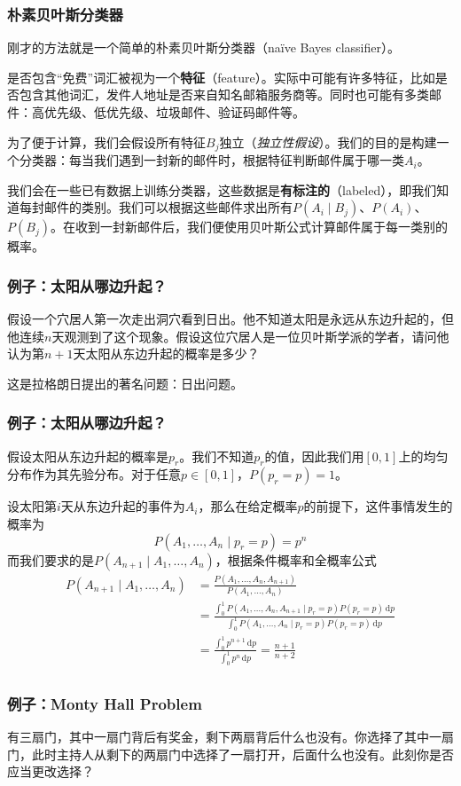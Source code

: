 \documentclass[9pt,dvipsnames]{beamer}
\renewcommand{\d}{\,\mathrm{d}}
\begin{document}
\begin{frame}
	\frametitle{朴素贝叶斯分类器}
	刚才的方法就是一个简单的朴素贝叶斯分类器（na\"ive Bayes classifier）。

	是否包含``免费''词汇被视为一个\textbf{特征}（feature）。实际中可能有许多特征，比如是否包含其他词汇，发件人地址是否来自知名邮箱服务商等。同时也可能有多类邮件：高优先级、低优先级、垃圾邮件、验证码邮件等。

	为了便于计算，我们会假设所有特征$B_j$独立（\textit{独立性假设}）。我们的目的是构建一个分类器：每当我们遇到一封新的邮件时，根据特征判断邮件属于哪一类$A_i$。

	我们会在一些已有数据上训练分类器，这些数据是\textbf{有标注的}（labeled），即我们知道每封邮件的类别。我们可以根据这些邮件求出所有$P(A_i\mid B_j)$、$P(A_i)$、$P(B_j)$。在收到一封新邮件后，我们便使用贝叶斯公式计算邮件属于每一类别的概率。
\end{frame}
\begin{frame}
	\frametitle{例子：太阳从哪边升起？}
	假设一个穴居人第一次走出洞穴看到日出。他不知道太阳是永远从东边升起的，但他连续$n$天观测到了这个现象。假设这位穴居人是一位贝叶斯学派的学者，请问他认为第$n+1$天太阳从东边升起的概率是多少？
	\vspace{1em}

	这是拉格朗日提出的著名问题：日出问题。
\end{frame}
\begin{frame}
	\frametitle{例子：太阳从哪边升起？}
	假设太阳从东边升起的概率是$p_r$。我们不知道$p_r$的值，因此我们用$[0,1]$上的均匀分布作为其先验分布。对于任意$p\in [0, 1]$，$P(p_r=p)=1$。\pause

	设太阳第$i$天从东边升起的事件为$A_i$，那么在给定概率$p$的前提下，这件事情发生的概率为
	\[ P(A_1,\ldots,A_n\mid p_r=p) = p^n \]
	而我们要求的是$P(A_{n+1}\mid A_1,\ldots,A_n)$，根据条件概率和全概率公式
	\begin{align*}
		P(A_{n+1}\mid A_1,\ldots,A_n) & = \frac{P(A_1,\ldots,A_n,A_{n+1})}{P(A_1,\ldots,A_n)} \\
		 & = \frac{\int_0^1 P(A_1,\ldots,A_n,A_{n+1}\mid p_r=p)P(p_r=p) \d p}{\int_0^1 P(A_1,\ldots,A_n\mid p_r=p)P(p_r=p) \d p} \\
		 & = \frac{\int_0^1 p^{n+1}\d p}{\int_0^1 p^n\d p} = \frac{n+1}{n+2} \\
	\end{align*}
\end{frame}
\begin{frame}
	\frametitle{例子：Monty Hall Problem}
	有三扇门，其中一扇门背后有奖金，剩下两扇背后什么也没有。你选择了其中一扇门，此时主持人从剩下的两扇门中选择了一扇打开，后面什么也没有。此刻你是否应当更改选择？
\end{frame}
\end{document}

